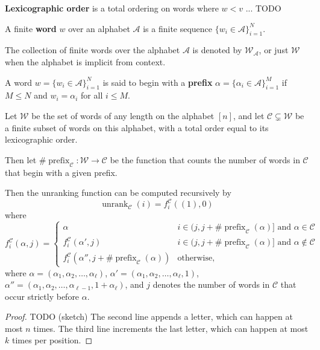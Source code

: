 \begin{definition}
  \textbf{Lexicographic order} is a total ordering on words where $w < v$ ... TODO
\end{definition}

\begin{definition}
  A finite \textbf{word} $w$ over an alphabet $\mathcal A$ is a finite sequence
  $\{w_i \in \mathcal A\}_{i=1}^N$.

  The collection of finite words over the alphabet $\mathcal A$ is denoted by
  $\mathcal{W}_\mathcal{A}$, or just $\mathcal{W}$ when the alphabet is
  implicit from context.
\end{definition}

\begin{definition}
  A word $w = \{w_i \in \mathcal A\}_{i=1}^N$ is said to begin with a
  \textbf{prefix} $\alpha = \{\alpha_i \in \mathcal A\}_{i=1}^M$ if
  $M \leq N$ and $w_i = \alpha_i$ for all $i \leq M$.
\end{definition}

\begin{lemma}
  Let $\mathcal{W}$ be the set of words of any length on the alphabet $[n]$,
  and let $\mathcal C \subsetneq \mathcal{W}$ be a finite subset of words
  on this alphabet, with a total order equal to its lexicographic order.

  Then let
  $\#\operatorname{prefix}_{\mathcal C}\colon \mathcal{W} \rightarrow \mathcal{C}$
  be the function that counts the number of words in $\mathcal C$ that begin
  with a given prefix.

  Then the unranking function can be computed recursively by \[
    \operatorname{unrank}_\mathcal{C}(i) = f^{\mathcal C}_i((1), 0)
  \] where
  \begin{equation}
  f^{\mathcal C}_i(\alpha, j) = \begin{cases}
    \alpha
      & i \in (j, j + \#\operatorname{prefix}_\mathcal{C}(\alpha)] \text{ and } \alpha \in \mathcal{C} \\
    f^{\mathcal C}_i(\alpha', j)
      & i \in (j, j + \#\operatorname{prefix}_\mathcal{C}(\alpha)] \text{ and } \alpha \not\in \mathcal{C} \\
    f^{\mathcal C}_i(\alpha'', j + \#\operatorname{prefix}_\mathcal{C}(\alpha))
      & \text{otherwise},
  \end{cases}
\end{equation}
where
$\alpha = (\alpha_1, \alpha_2, \dots, \alpha_\ell)$,
$\alpha' = (\alpha_1, \alpha_2, \dots, \alpha_\ell, 1)$,
$\alpha'' = (\alpha_1, \alpha_2, \dots, \alpha_{\ell-1}, 1 + \alpha_\ell)$,
and $j$ denotes the number of words in $\mathcal{C}$ that occur strictly
before $\alpha$.
\end{lemma}
\begin{proof}
  TODO (sketch)
  The second line appends a letter, which can happen at most $n$ times.
  The third line increments the last letter, which can happen at most $k$ times
  per position.
\end{proof}

